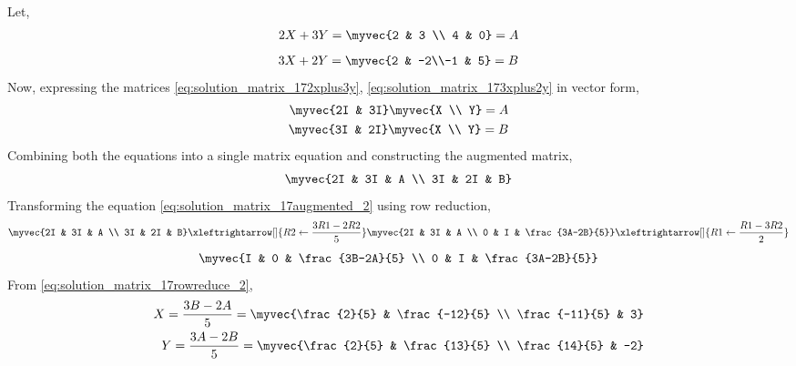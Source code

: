  Let,
\begin{align} \label{eq:solution_matrix_172xplus3y}
    2X+3Y=\myvec{2 & 3 \\ 4 & 0}=A
\end{align}
\begin{align} \label{eq:solution_matrix_173xplus2y}
    3X+2Y=\myvec{2 & -2\\-1 & 5}=B
\end{align}
Now, expressing the matrices \eqref{eq:solution_matrix_172xplus3y}, \eqref{eq:solution_matrix_173xplus2y} in vector form, 
\begin{align}
    \myvec{2I & 3I} \myvec{X \\ Y} = A \nonumber\\
    \myvec{3I & 2I} \myvec{X \\ Y} = B \nonumber
\end{align}
Combining both the equations into a single matrix equation and constructing the augmented matrix,
\begin{align} \label{eq:solution_matrix_17augmented_2}
    \myvec{2I & 3I & A \\ 3I & 2I & B} 
\end{align}
Transforming the equation \eqref{eq:solution_matrix_17augmented_2} using row reduction,
\begin{align}
    \myvec{2I & 3I & A \\ 3I & 2I & B} \xleftrightarrow[]{R2 \leftarrow \frac{3R1-2R2}{5}} \myvec{2I & 3I & A \\ 0 & I & \frac{3A-2B}{5}} \xleftrightarrow[]{R1 \leftarrow \frac{R1-3R2}{2}} \nonumber
\end{align}
\begin{align} \label{eq:solution_matrix_17rowreduce_2}
    \myvec{I & 0 & \frac{3B-2A}{5} \\ 0 & I & \frac{3A-2B}{5}}
\end{align}
From \eqref{eq:solution_matrix_17rowreduce_2},
\begin{align}
    X = \frac{3B-2A}{5} = \myvec{\frac{2}{5} & \frac{-12}{5} \\ \frac{-11}{5} & 3} \\
    Y = \frac{3A-2B}{5} = \myvec{\frac{2}{5} & \frac{13}{5} \\ \frac{14}{5} & -2}
\end{align}
